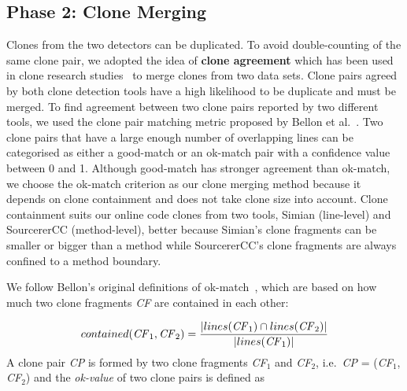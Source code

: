\documentclass[10pt,journal,compsoc]{IEEEtran}
\newcommand{\squeezeup}{\vspace{-0.5mm}}
\begin{document}
\subsection{Phase 2: Clone Merging} Clones from the two detectors can be
duplicated. To avoid double-counting of the same clone pair, we adopted the idea
of \textbf{clone agreement} which has been used in clone research
studies~\cite{Funaro2010, Wang2013,cr2016ssbse} to merge clones from two data
sets. Clone pairs agreed by both clone detection tools have a high
likelihood to be duplicate and must be merged. 
To find agreement between two clone
pairs reported by two different tools, we used the clone pair matching metric
proposed by Bellon et al.~\cite{Bellon2007}. Two clone pairs that have a large
enough number of overlapping lines can be categorised as either a good-match or
an ok-match pair with a
confidence value between 0 and 1. Although good-match has stronger agreement
than ok-match, we choose the ok-match criterion as our clone merging method
because it depends on clone containment and does
not take clone size into account. Clone containment suits our online code clones
from two tools, Simian (line-level) and SourcererCC (method-level), better
because Simian's clone fragments can be smaller or bigger than a method
while SourcererCC's clone fragments are always confined to a method boundary.

We follow Bellon's original definitions of ok-match~\cite{Bellon2007}, which are based on how much two clone
fragments \textit{CF} are contained in each other:

\begin{displaymath}
contained(\textrm{\textit{CF}}_1, \textrm{\textit{CF}}_2) = \frac{|lines(\textrm{\textit{CF}}_1) \cap lines(\textrm{\textit{CF}}_2)|}{|lines(\textrm{\textit{CF}}_1)|}
\end{displaymath}
\noindent%
A clone pair \textit{CP} is formed by two clone fragments
\textit{CF$_1$} and \textit{CF$_2$}, i.e.~\textit{CP} =
(\textit{CF$_1$}, \textit{CF$_2$})
and the \textit{ok-value} of two clone pairs is defined as
\end{document}
